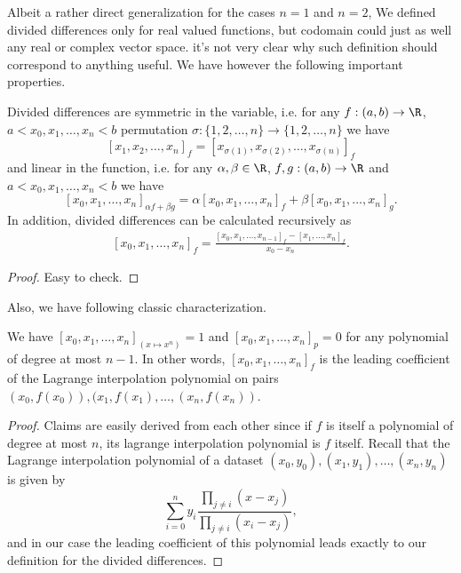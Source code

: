 Albeit a rather direct generalization for the cases $n = 1$ and $n = 2$, We defined divided differences only for real valued functions, but codomain could just as well any real or complex vector space. it's not very clear why such definition should correspond to anything useful. We have however the following important properties.

\begin{prop}
	Divided differences are symmetric in the variable, i.e. for any $f : (a, b) \to \R$, $a < x_{0}, x_{1}, \ldots, x_{n} < b$ permutation $\sigma : \{1, 2, \ldots, n\} \to \{1, 2, \ldots, n\}$ we have
	\[
		[x_{1}, x_{2}, \ldots, x_{n}]_{f} = [x_{\sigma(1)}, x_{\sigma(2)}, \ldots, x_{\sigma(n)}]_{f}
	\]
	and linear in the function, i.e. for any $\alpha, \beta \in \R$, $f, g : (a, b) \to \R$ and $a < x_{0}, x_{1}, \ldots, x_{n} < b$ we have
	\[
		[x_{0}, x_{1}, \ldots, x_{n}]_{\alpha f + \beta g} = \alpha [x_{0}, x_{1}, \ldots, x_{n}]_{f} + \beta [x_{0}, x_{1}, \ldots, x_{n}]_{g}.
	\]
	In addition, divided differences can be calculated recursively as
	\begin{align}\label{divdif_rec}
		[x_{0}, x_{1}, \ldots, x_{n}]_{f} = \frac{[x_{0}, x_{1}, \ldots, x_{n - 1}]_{f} - [x_{1}, \ldots, x_{n}]_{f}}{x_{0} - x_{n}}.
	\end{align}
\end{prop}
\begin{proof}
	Easy to check.
\end{proof}

Also, we have following classic characterization.

\begin{prop}
We have $[x_{0}, x_{1}, \ldots, x_{n}]_{(x \mapsto x^{n})} = 1$ and $[x_{0}, x_{1}, \ldots, x_{n}]_{p} = 0$ for any polynomial of degree at most $n - 1$. In other words, $[x_{0}, x_{1}, \ldots, x_{n}]_{f}$ is the leading coefficient of the Lagrange interpolation polynomial on pairs $(x_{0}, f(x_{0})), (x_{1}, f(x_{1}), \ldots, (x_{n}, f(x_{n}))$.
\end{prop}
\begin{proof}
	Claims are easily derived from each other since if $f$ is itself a polynomial of degree at most $n$, its lagrange interpolation polynomial is $f$ itself. Recall that the Lagrange interpolation polynomial of a dataset $(x_{0}, y_{0}), (x_{1}, y_{1}), \ldots, (x_{n}, y_{n})$ is given by
	\[
		\sum_{i = 0}^{n} y_{i} \frac{\prod_{j \neq i}(x - x_{j})}{\prod_{j \neq i}(x_{i} - x_{j})},
	\]
	and in our case the leading coefficient of this polynomial leads exactly to our definition for the divided differences.
\end{proof}

